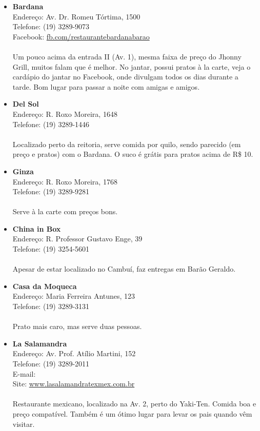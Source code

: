 \begin{itemize}
\item \textbf{Bardana}
  \\Endereço: Av. Dr. Romeu Tórtima, 1500
  \\Telefone: (19) 3289-9073
  \\Facebook: \url{fb.com/restaurantebardanabarao}
  \\
  \\Um pouco acima da entrada II (Av. 1), mesma faixa de preço do Jhonny Grill,
  muitos falam que é melhor. No jantar, possui pratos à la carte, veja o
  cardápio do jantar no Facebook, onde divulgam todos os dias durante a tarde.
  Bom lugar para passar a noite com amigas e amigos.

\item \textbf{Del Sol}
  \\Endereço: R. Roxo Moreira, 1648
  \\Telefone: (19) 3289-1446
  \\
  \\Localizado perto da reitoria, serve comida por quilo, sendo parecido (em
  preço e pratos) com o Bardana. O suco é grátis para pratos acima de R\$ 10.

\item \textbf{Ginza}
  \\Endereço: R. Roxo Moreira, 1768
  \\Telefone: (19) 3289-9281
  \\
  \\Serve à la carte com preços bons.

\item \textbf{China in Box}
  \\Endereço: R. Professor Gustavo Enge, 39
  \\Telefone: (19) 3254-5601
  \\
  \\Apesar de estar localizado no Cambuí, faz entregas em Barão Geraldo.

\item \textbf{Casa da Moqueca}
  \\Endereço: Maria Ferreira Antunes, 123
  \\Telefone: (19) 3289-3131
  \\
  \\Prato mais caro, mas serve duas pessoas.

\item \textbf{La Salamandra}
  \\Endereço: Av. Prof. Atílio Martini, 152
  \\Telefone: (19) 3289-2011
  \\E-mail: 
  \\Site: \url{www.lasalamandratexmex.com.br}
  \\
  \\Restaurante mexicano, localizado na Av. 2, perto do Yaki-Ten. Comida boa e
  preço compatível. Também é um ótimo lugar para levar os pais quando vêm
  visitar.


\end{itemize}
